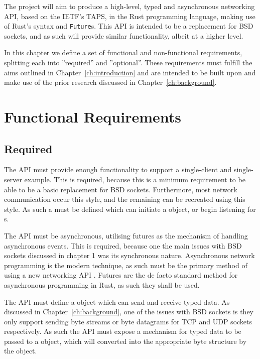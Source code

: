 The project will aim to produce a high-level, typed and asynchronous networking API, based on the IETF's TAPS, in the
Rust programming language, making use of Rust's \asyncawait syntax and \texttt{Future}s.
This API is intended to be a replacement for BSD sockets, and as such will provide similar functionality, albeit at a
higher level.

In this chapter we define a set of functional and non-functional requirements, splitting each into ''required'' and
''optional''.
These requirements must fulfill the aims outlined in Chapter~\ref{ch:introduction} and are intended to be built upon and
make use of the prior research discussed in Chapter~\ref{ch:background}.

\section{Functional Requirements}\label{sec:functional-requirements}

\subsection{Required}\label{subsec:required}

The API must provide enough functionality to support a single-client and single-server example.
This is required, because this is a minimum requirement to be able to be a basic replacement for BSD sockets.
Furthermore, most network communication occur this style, and the remaining can be recreated using this style.
As such a \preconnection{} must be defined which can initiate a \connection{} object, or begin listening for
\connection{}s.

The API must be asynchronous, utilising futures as the mechanism of handling asynchronous events.
This is required, because one the main issues with BSD sockets discussed in chapter 1 was its synchronous nature.
Asynchronous network programming is the modern technique, as such must be the primary method of using a new networking
API .
Futures are the de facto standard method for asynchronous programming in Rust, as such they shall be used.

The API must define a \connection{} object which can send and receive typed data.
As discussed in Chapter~\ref{ch:background}, one of the issues with BSD sockets is they only support sending byte
streams or byte datagrams for TCP and UDP sockets respectively.
As such the API must expose a mechanism for typed data to be passed to a \connection{} object, which will converted into
the appropriate byte structure by the \connection{} object.

